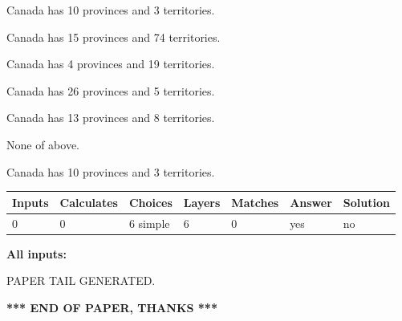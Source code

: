 \documentclass[12pt]{article}
\begin{document}
 
Canada has 10  provinces and 3 territories.
 
 
Canada has  15 provinces and  74 territories.
 
 
Canada has   4 provinces and  19 territories.
 
 
Canada has  26 provinces and  5 territories.
 
 
Canada has  13 provinces and  8 territories.
 
 
 None of above.
 
 
\noindent{}
 
 
Canada has 10  provinces and 3 territories.
 
 
\noindent{}
 
 
   
   
   
   
\noindent\begin{tabular}{|l|l|l|l|l|l|l|}
 \hline
Inputs & Calculates & Choices & Layers & Matches & Answer & Solution \\ \hline
 0  & 
 0  & 
 6
  simple  
  & 
 6  & 
 0  & 
  yes & 
  no 
  \\ \hline
 \end{tabular}
   
   
   
   
\noindent{}
   
   
   
   
\noindent\vspace{0.1in}\hspace{-0.08in} {\textbf{\Large{All inputs: }}}
   
   
   
   
   
   
 \vspace{0.2in}
 
   
   
\vspace{2.0in} PAPER TAIL GENERATED.
   
   
   
   
\vspace{1.0in} 
{\textbf{\large{ *** END OF PAPER, THANKS *** }}} 
   
\end{document}
